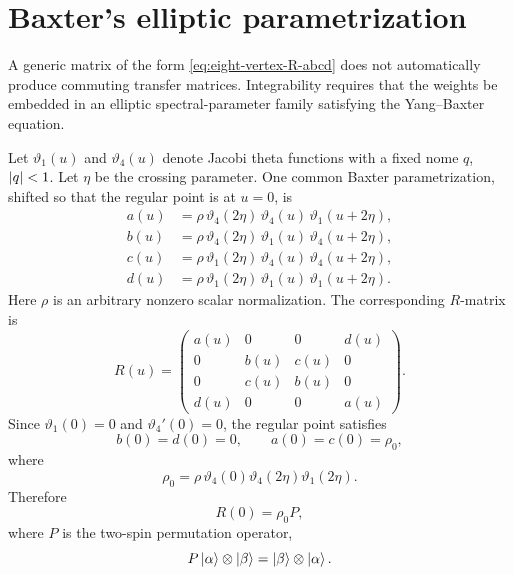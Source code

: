 \section{Baxter's elliptic parametrization}
\label{sec:baxter-elliptic-parametrization}

A generic matrix of the form \cref{eq:eight-vertex-R-abcd} does not automatically
produce commuting transfer matrices.  Integrability requires that the weights be
embedded in an elliptic spectral-parameter family satisfying the Yang--Baxter
equation.

Let $\vartheta_1(u)$ and $\vartheta_4(u)$ denote Jacobi theta functions with a
fixed nome $q$, $\left|q\right|<1$.  Let $\eta$ be the crossing parameter.  One common
Baxter parametrization, shifted so that the regular point is at $u=0$, is
\begin{equation}
\label{eq:eight-vertex-elliptic-weights}
\begin{aligned}
    a(u)&=\rho\,\vartheta_4(2\eta)\,\vartheta_4(u)\,\vartheta_1(u+2\eta),\\
    b(u)&=\rho\,\vartheta_4(2\eta)\,\vartheta_1(u)\,\vartheta_4(u+2\eta),\\
    c(u)&=\rho\,\vartheta_1(2\eta)\,\vartheta_4(u)\,\vartheta_4(u+2\eta),\\
    d(u)&=\rho\,\vartheta_1(2\eta)\,\vartheta_1(u)\,\vartheta_1(u+2\eta).
\end{aligned}
\end{equation}
Here $\rho$ is an arbitrary nonzero scalar normalization.  The corresponding
$R$-matrix is
\begin{equation}
\label{eq:eight-vertex-R-u}
    R(u)=
    \begin{pmatrix}
        a(u)&0&0&d(u)\\
        0&b(u)&c(u)&0\\
        0&c(u)&b(u)&0\\
        d(u)&0&0&a(u)
    \end{pmatrix}.
\end{equation}
Since $\vartheta_1(0)=0$ and $\vartheta_4'(0)=0$, the regular point satisfies
\begin{equation}
\label{eq:eight-vertex-regularity}
    b(0)=d(0)=0,
    \qquad
    a(0)=c(0)=\rho_0,
\end{equation}
where
\begin{equation}
\label{eq:eight-vertex-rho0}
    \rho_0
    =\rho\,\vartheta_4(0)\vartheta_4(2\eta)\vartheta_1(2\eta).
\end{equation}
Therefore
\begin{equation}
\label{eq:eight-vertex-R0-P}
    R(0)=\rho_0 P,
\end{equation}
where $P$ is the two-spin permutation operator,
\begin{equation}
\label{eq:eight-vertex-permutation-operator}
    P\left|\alpha\right\rangle\otimes\left|\beta\right\rangle
    =\left|\beta\right\rangle\otimes\left|\alpha\right\rangle.
\end{equation}

